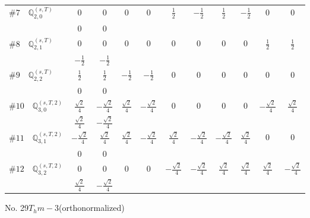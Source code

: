 \documentclass[fleqn,9pt,landscape]{jsarticle}
\begin{document}
\begin{center}
\begin{longtable}{lcccccccccc}
$ \#7\quad \mathbb{Q}_{2,0}^{(s,T)} $ & $ 0 $ & $ 0 $ & $ 0 $ & $ 0 $ & $ \frac{1}{2} $ & $ - \frac{1}{2} $ & $ \frac{1}{2} $ & $ - \frac{1}{2} $ & $ 0 $ & $ 0 $ \\
& $ 0 $ & $ 0 $ & $  $ & $  $ & $  $ & $  $ & $  $ & $  $ & $  $ & $  $ \\ \hline
$ \#8\quad \mathbb{Q}_{2,1}^{(s,T)} $ & $ 0 $ & $ 0 $ & $ 0 $ & $ 0 $ & $ 0 $ & $ 0 $ & $ 0 $ & $ 0 $ & $ \frac{1}{2} $ & $ \frac{1}{2} $ \\
& $ - \frac{1}{2} $ & $ - \frac{1}{2} $ & $  $ & $  $ & $  $ & $  $ & $  $ & $  $ & $  $ & $  $ \\ \hline
$ \#9\quad \mathbb{Q}_{2,2}^{(s,T)} $ & $ \frac{1}{2} $ & $ \frac{1}{2} $ & $ - \frac{1}{2} $ & $ - \frac{1}{2} $ & $ 0 $ & $ 0 $ & $ 0 $ & $ 0 $ & $ 0 $ & $ 0 $ \\
& $ 0 $ & $ 0 $ & $  $ & $  $ & $  $ & $  $ & $  $ & $  $ & $  $ & $  $ \\ \hline
$ \#10\quad \mathbb{Q}_{3,0}^{(s,T,2)} $ & $ \frac{\sqrt{2}}{4} $ & $ - \frac{\sqrt{2}}{4} $ & $ \frac{\sqrt{2}}{4} $ & $ - \frac{\sqrt{2}}{4} $ & $ 0 $ & $ 0 $ & $ 0 $ & $ 0 $ & $ - \frac{\sqrt{2}}{4} $ & $ \frac{\sqrt{2}}{4} $ \\
& $ \frac{\sqrt{2}}{4} $ & $ - \frac{\sqrt{2}}{4} $ & $  $ & $  $ & $  $ & $  $ & $  $ & $  $ & $  $ & $  $ \\ \hline
$ \#11\quad \mathbb{Q}_{3,1}^{(s,T,2)} $ & $ - \frac{\sqrt{2}}{4} $ & $ \frac{\sqrt{2}}{4} $ & $ \frac{\sqrt{2}}{4} $ & $ - \frac{\sqrt{2}}{4} $ & $ \frac{\sqrt{2}}{4} $ & $ - \frac{\sqrt{2}}{4} $ & $ - \frac{\sqrt{2}}{4} $ & $ \frac{\sqrt{2}}{4} $ & $ 0 $ & $ 0 $ \\
& $ 0 $ & $ 0 $ & $  $ & $  $ & $  $ & $  $ & $  $ & $  $ & $  $ & $  $ \\ \hline
$ \#12\quad \mathbb{Q}_{3,2}^{(s,T,2)} $ & $ 0 $ & $ 0 $ & $ 0 $ & $ 0 $ & $ - \frac{\sqrt{2}}{4} $ & $ - \frac{\sqrt{2}}{4} $ & $ \frac{\sqrt{2}}{4} $ & $ \frac{\sqrt{2}}{4} $ & $ \frac{\sqrt{2}}{4} $ & $ - \frac{\sqrt{2}}{4} $ \\
& $ \frac{\sqrt{2}}{4} $ & $ - \frac{\sqrt{2}}{4} $ & $  $ & $  $ & $  $ & $  $ & $  $ & $  $ & $  $ & $  $ \\
\end{longtable}
\end{center}
\newpage
\begin{center}
\LARGE
No. 29\quad$T_{h}$\quad$m-3$\quad[ cubic ] (orthonormalized)
\end{center}
\vspace{5mm}
\end{document}
